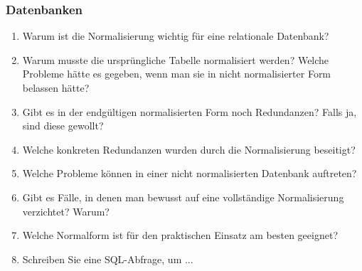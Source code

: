 \documentclass[a4paper,12pt]{article}
\begin{document}
	\subsubsection*{Datenbanken}
	\begin{enumerate}
		\item Warum ist die Normalisierung wichtig für eine relationale Datenbank?
		\item Warum musste die ursprüngliche Tabelle normalisiert werden? Welche Probleme hätte es gegeben, wenn man sie in nicht normalisierter Form belassen hätte?
		\item Gibt es in der endgültigen normalisierten Form noch Redundanzen? Falls ja, sind diese gewollt?
		\item Welche konkreten Redundanzen wurden durch die Normalisierung beseitigt?
		\item Welche Probleme können in einer nicht normalisierten Datenbank auftreten?
		\item Gibt es Fälle, in denen man bewusst auf eine vollständige Normalisierung verzichtet? Warum?
		\item Welche Normalform ist für den praktischen Einsatz am besten geeignet?
		\item Schreiben Sie eine SQL-Abfrage, um ...
	\end{enumerate}
	
\end{document}
